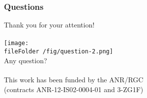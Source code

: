 \begin{frame} \frametitle{Questions}
  
  
  \vspace*{-0.5cm}
  \begin{center}
  	Thank you for your attention!\\
  	~\\
    \texttt{[image: \\fileFolder /fig/question-2.png]}\\
	Any question?\\
    ~\\
  {\footnotesize This work has been funded by the ANR/RGC\\(contracts ANR-12-IS02-0004-01 and 3-ZG1F)}
  \end{center}
\end{frame}